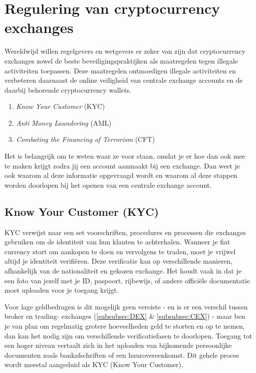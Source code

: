 \section{Regulering van cryptocurrency exchanges}
\label{sec:exchange-security}
Wereldwijd willen regelgevers en wetgevers er zeker van zijn dat cryptocurrency exchanges zowel de beste beveiligingspraktijken als maatregelen tegen illegale activiteiten toepassen. Deze maatregelen ontmoedigen illegale activiteiten en verbeteren daarnaast de online veiligheid van centrale exchange accounts en de daarbij behorende cryptocurrency wallets. 

\begin{enumerate}
    \item \emph{Know Your Customer} (KYC)
    \item \emph{Anti Money Laundering} (AML)
    \item \emph{Combating the Financing of Terrorism} (CFT)
\end{enumerate} 

Het is belangrijk om te weten waar ze voor staan, omdat je er hoe dan ook mee te maken krijgt zodra jij een account aanmaakt bij een exchange. Dan weet je ook waarom al deze informatie opgevraagd wordt en waarom al deze stappen worden doorlopen bij het openen van een centrale exchange account.


\subsection*{Know Your Customer (KYC)}
\label{par:KYC}
KYC verwijst naar een set voorschriften, procedures en processen die exchanges gebruiken om de identiteit van hun klanten te achterhalen. Wanneer je fiat currency stort om aankopen te doen en vervolgens te traden, moet je vrijwel altijd je identiteit verifi{\"e}ren. Deze verificatie kan op verschillende manieren, afhankelijk van de nationaliteit en gekozen exchange. Het houdt vaak in dat je een foto van jezelf met je ID, paspoort, rijbewijs, of andere offici{\"e}le documentatie moet uploaden voor je toegang krijgt.\medskip

Voor lage geldbedragen is dit mogelijk geen vereiste - en is er een verschil tussen broker en trading- exchanges (\cref{subsubsec:DEX} \& \cref{subsubsec:CEX}) - maar ben je van plan om regelmatig grotere hoeveelheden geld te storten en op te nemen, dan kan het nodig zijn om verschillende verificatiefasen te doorlopen. Toegang tot een hoger niveau vertaalt zich in het uploaden van bijkomende persoonlijke documenten zoals bankafschriften of een huurovereenkomst. Dit gehele proces wordt meestal aangeduid als KYC (Know Your Customer).


